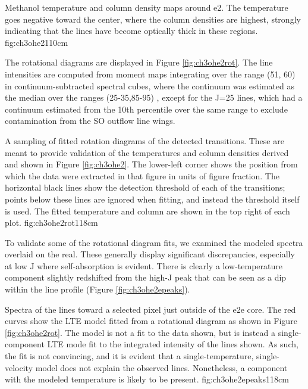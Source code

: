 \documentclass{aa}
\begin{document}
{Methanol temperature and column density maps around e2.  The temperature goes
negative toward the center, where the column densities are highest, strongly
indicating that the lines have become optically thick in these regions.}
{fig:ch3ohe2}{1}{10cm}

The rotational diagrams are displayed in Figure \ref{fig:ch3ohe2rot}.
The line intensities are computed from moment maps integrating over the range
(51, 60) \kms in continuum-subtracted spectral cubes, where the continuum
was estimated as the median over the ranges (25-35,85-95) \kms, except
for the J=25 lines, which had a continuum estimated from the 10th percentile
over the same range to exclude contamination from the SO outflow line wings.

{A sampling of fitted rotation diagrams of the detected \methanol transitions.
These are meant to provide validation of the temperatures and column densities
derived and shown in Figure \ref{fig:ch3ohe2}.  The lower-left corner shows
the position from which the data were extracted in that figure in units of
figure fraction.  The horizontal black lines show the detection threshold of each
of the transitions; points below these lines are ignored when fitting, and instead
the threshold itself is used.  The fitted temperature and
column are shown in the top right of each plot.
}{fig:ch3ohe2rot}{1}{18cm}

To validate some of the rotational diagram fits, we examined the modeled
spectra overlaid on the real.  These generally display significant
discrepancies, especially at low J where self-absorption is evident.  There is
clearly a low-temperature component slightly redshifted from the high-J peak
that can be seen as a dip within the line profile (Figure
\ref{fig:ch3ohe2epeaks}).


{Spectra of the \methanol lines toward a selected pixel just outside of the e2e
core.  The red curves show the LTE model fitted from a rotational diagram as
shown in Figure \ref{fig:ch3ohe2rot}.  The model is not a fit to the data
shown, but is instead a single-component LTE mode fit to the integrated
intensity of the lines shown.  As such, the fit is not convincing, and it is
evident that a single-temperature, single-velocity model does not explain the
observed lines.  Nonetheless, a component with the modeled temperature is
likely to be present.}
{fig:ch3ohe2epeaks}{1}{18cm}
 
\end{document}
